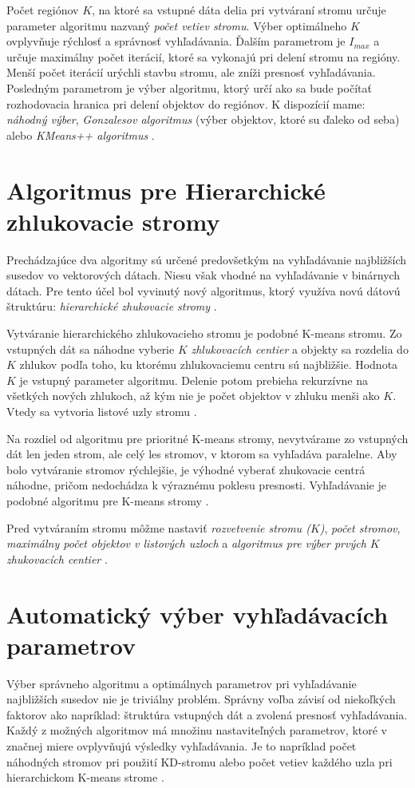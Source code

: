 \documentclass[12pt,a4paper,oneside]{fithesis2}
\begin{document}
	Počet regiónov $K$, na ktoré sa vstupné dáta delia pri vytváraní stromu určuje parameter algoritmu nazvaný \textit{počet vetiev stromu}. Výber optimálneho $K$ ovplyvňuje rýchlosť a správnosť vyhľadávania. Ďalším parametrom je $I_{max}$ a určuje maximálny počet iterácií, ktoré sa vykonajú pri delení stromu na regióny. Menší počet iterácií urýchli stavbu stromu, ale zníži presnosť vyhľadávania. Posledným parametrom je výber algoritmu, ktorý určí ako sa bude počítať rozhodovacia hranica pri delení objektov do regiónov. K dispozícií mame: \textit{náhodný výber}, \textit{Gonzalesov algoritmus} (výber objektov, ktoré su ďaleko od seba)\cite{flann_pami_2014} alebo \textit{KMeans++ algoritmus} \cite{K-means++}.
	\section{Algoritmus pre Hierarchické zhlukovacie stromy}
	Prechádzajúce dva algoritmy sú určené predovšetkým na vyhľadávanie najbližších susedov vo vektorových dátach. Niesu však vhodné na vyhľadávanie v binárnych dátach. Pre tento účel bol vyvinutý nový algoritmus, ktorý využíva novú dátovú štruktúru: \textit{hierarchické zhukovacie stromy} \cite{Attach:binary_matching_crv2012}.
	
	Vytváranie hierarchického zhlukovacieho stromu je podobné K-means stromu.   Zo vstupných dát sa náhodne vyberie $K$ \textit{zhlukovacích centier} a objekty sa rozdelia do $K$ zhlukov podľa toho, ku ktorému zhlukovaciemu centru sú najbližšie. Hodnota $K$ je vstupný parameter algoritmu. Delenie potom prebieha rekurzívne na všetkých nových zhlukoch, až kým nie je počet objektov v zhluku menši ako $K$. Vtedy sa vytvoria listové uzly stromu \cite{Attach:binary_matching_crv2012}.
	
	Na rozdiel od algoritmu pre prioritné K-means stromy, nevytvárame zo vstupných dát len jeden strom, ale celý les stromov, v ktorom sa vyhľadáva paralelne. Aby bolo vytváranie stromov rýchlejšie, je výhodné vyberať zhukovacie centrá náhodne, pričom nedochádza k výraznému poklesu presnosti. Vyhľadávanie je podobné algoritmu pre K-means stromy \cite{Attach:binary_matching_crv2012}.
	
	Pred vytváraním stromu môžme nastaviť \textit{rozvetvenie stromu ($K$)}, \textit{počet stromov}, \textit{maximálny počet objektov v listových uzloch} a \textit{algoritmus pre výber prvých $K$ zhukovacích centier} \cite{Attach:binary_matching_crv2012}.
	
	\section{Automatický výber vyhľadávacích parametrov}\label{sec:autotuning}
	Výber správneho algoritmu a optimálnych parametrov pri vyhľadávanie najbližších susedov nie je triviálny problém. Správny voľba závisí od niekoľkých faktorov ako napríklad: štruktúra vstupných dát a zvolená presnosť vyhľadávania. Každý z možných algoritmov má množinu nastaviteľných parametrov, ktoré v značnej miere ovplyvňujú výsledky vyhľadávania. Je to napríklad počet náhodných stromov pri použití KD-stromu alebo počet vetiev každého uzla pri hierarchickom K-means strome \cite{muja_flann_2009}.
	
\end{document}
